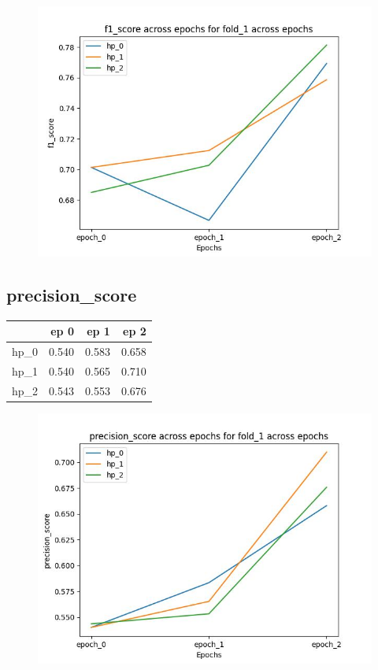 \documentclass{article}
\begin{document}
\begin{figure}[H]
\includegraphics[scale = 0.75]{fold_1/f1_score}
\end{figure}
\subsection{precision\_score}
\begin{tabular}{lrrr}
\toprule
{} &   ep 0 &   ep 1 &   ep 2 \\
\midrule
hp\_0 &  0.540 &  0.583 &  0.658 \\
hp\_1 &  0.540 &  0.565 &  0.710 \\
hp\_2 &  0.543 &  0.553 &  0.676 \\
\bottomrule
\end{tabular}

\begin{figure}[H]
\includegraphics[scale = 0.75]{fold_1/precision_score}
\end{figure}
\end{document}
